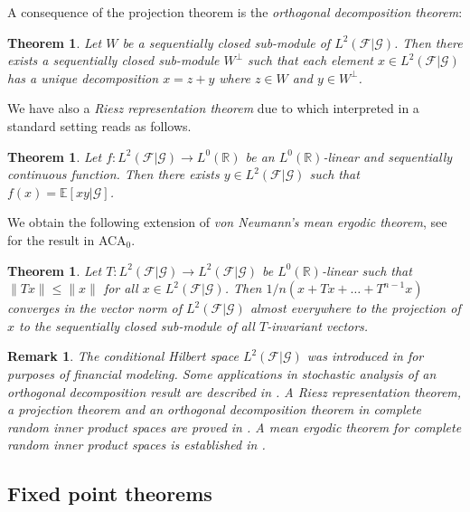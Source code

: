\documentclass{jloganal}
\numberwithin{equation}{section}
\theoremstyle{plain}
\newtheorem{theorem}[subsection]{Theorem}
\newtheorem{remark}[subsection]{Remark}
\renewcommand{\leq}{\leqslant}
\renewcommand\R{\mathbb{R}}
\begin{document}
A consequence of the projection theorem is the \emph{orthogonal decomposition theorem}: 

\begin{theorem}
Let $W$ be a sequentially closed sub-module of $L^2(\mathcal{F}|\mathcal{G})$.
Then there exists a sequentially closed sub-module $W^\bot$ such that each element $x\in L^2(\mathcal{F}|\mathcal{G})$ has a unique decomposition $x=z+y$ where $z\in W$ and $y\in W^\bot$. 
\end{theorem}
 
We have also a \emph{Riesz representation theorem} due to \cite[Theorem 13.4]{avigad2006fundamental} which interpreted in a standard setting reads as follows.  

\begin{theorem}
Let $f\colon L^2(\mathcal{F}|\mathcal{G}) \to L^0(\mathbb{R})$ be an $L^0(\R)$-linear and sequentially continuous function. 
Then there exists $y\in L^2(\mathcal{F}|\mathcal{G})$ such that $f(x)=\mathbb{E}[ xy |\mathcal{G}]$.   
\end{theorem} 
We obtain the following extension of \emph{von Neumann's mean ergodic theorem}, see \cite{avigad2006fundamental} for the result in ACA$_0$. 
\begin{theorem}
Let $T\colon L^2(\mathcal{F}|\mathcal{G})\to L^2(\mathcal{F}|\mathcal{G})$ be $L^0(\R)$-linear such that $\|Tx\|\leq \|x\|$ for all $x\in L^2(\mathcal{F}|\mathcal{G})$.   
Then $1/n(x + Tx +\ldots + T^{n-1} x)$ converges in the vector norm of $L^2(\mathcal{F}|\mathcal{G})$ almost everywhere to the projection of $x$ to the sequentially closed sub-module of all $T$-invariant vectors.  
\end{theorem} 

\begin{remark}
The conditional Hilbert space $L^2(\mathcal{F}|\mathcal{G})$ was introduced in \cite{hansen1987role} for purposes of financial modeling. 
Some applications in stochastic analysis of an orthogonal decomposition result are described in  \cite{cerreia2017orthogonal}. 
A Riesz representation theorem, a projection theorem and an orthogonal decomposition theorem in complete random inner product spaces are proved in \cite[Section 4]{guo2013homo}. 
A mean ergodic theorem for complete random inner product spaces is established in \cite{guo2011neumann}. 
\end{remark}


\subsection{Fixed point theorems}
\end{document}
